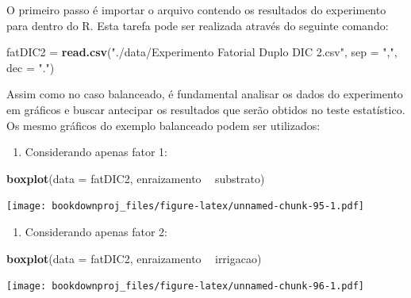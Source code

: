 \documentclass[
]{article}
\newenvironment{Shaded}{\begin{snugshade}}{\end{snugshade}}
\newcommand{\DataTypeTok}[1]{\textcolor[rgb]{0.13,0.29,0.53}{#1}}
\newcommand{\KeywordTok}[1]{\textcolor[rgb]{0.13,0.29,0.53}{\textbf{#1}}}
\newcommand{\NormalTok}[1]{#1}
\newcommand{\OperatorTok}[1]{\textcolor[rgb]{0.81,0.36,0.00}{\textbf{#1}}}
\newcommand{\StringTok}[1]{\textcolor[rgb]{0.31,0.60,0.02}{#1}}
\providecommand{\tightlist}{%
  \setlength{\itemsep}{0pt}\setlength{\parskip}{0pt}}
\begin{document}
O primeiro passo é importar o arquivo contendo os resultados do experimento para dentro do R. Esta tarefa pode ser realizada através do seguinte comando:

\begin{Shaded}
\begin{Highlighting}[]
\NormalTok{fatDIC2 =}\StringTok{ }\KeywordTok{read.csv}\NormalTok{(}\StringTok{"./data/Experimento Fatorial Duplo DIC 2.csv"}\NormalTok{, }
                   \DataTypeTok{sep =} \StringTok{","}\NormalTok{, }\DataTypeTok{dec =} \StringTok{"."}\NormalTok{)}
\end{Highlighting}
\end{Shaded}

Assim como no caso balanceado, é fundamental analisar os dados do experimento em gráficos e buscar antecipar os resultados que serão obtidos no teste estatístico. Os mesmo gráficos do exemplo balanceado podem ser utilizados:

\begin{enumerate}
\def\labelenumi{\arabic{enumi}.}
\tightlist
\item
  Considerando apenas fator 1:
\end{enumerate}

\begin{Shaded}
\begin{Highlighting}[]
\KeywordTok{boxplot}\NormalTok{(}\DataTypeTok{data =}\NormalTok{ fatDIC2, enraizamento }\OperatorTok{~}\StringTok{ }\NormalTok{substrato)}
\end{Highlighting}
\end{Shaded}

\texttt{[image: bookdownproj\_files/figure-latex/unnamed-chunk-95-1.pdf]}

\begin{enumerate}
\def\labelenumi{\arabic{enumi}.}
\setcounter{enumi}{1}
\tightlist
\item
  Considerando apenas fator 2:
\end{enumerate}

\begin{Shaded}
\begin{Highlighting}[]
\KeywordTok{boxplot}\NormalTok{(}\DataTypeTok{data =}\NormalTok{ fatDIC2, enraizamento }\OperatorTok{~}\StringTok{ }\NormalTok{irrigacao)}
\end{Highlighting}
\end{Shaded}

\texttt{[image: bookdownproj\_files/figure-latex/unnamed-chunk-96-1.pdf]}
\end{document}
